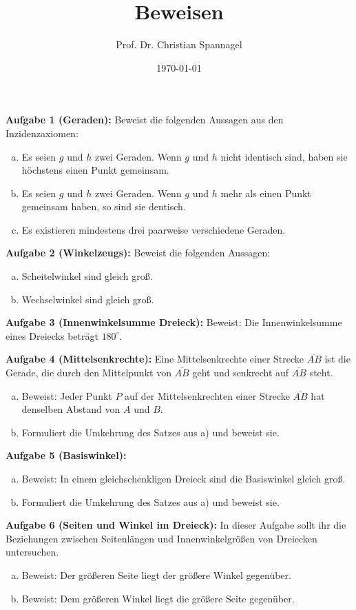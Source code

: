 \documentclass{../cssheet}
\title{Beweisen}
\author{Prof. Dr. Christian Spannagel}
\date{\today}
\begin{document}
\printtitle

\textbf{Aufgabe 1 (Geraden):}  Beweist die folgenden Aussagen aus den Inzidenzaxiomen:
\begin{enumerate}[a)]
\item Es seien $g$ und $h$ zwei Geraden. Wenn $g$ und $h$ nicht identisch sind, haben sie höchstens einen Punkt gemeinsam.
\item Es seien $g$ und $h$ zwei Geraden. Wenn $g$ und $h$ mehr als einen Punkt gemeinsam haben, so sind sie dentisch.
\item Es existieren mindestens drei paarweise verschiedene Geraden.
\end{enumerate}

\textbf{Aufgabe 2 (Winkelzeugs):}  Beweist die folgenden Aussagen:
\begin{enumerate}[a)]
\item Scheitelwinkel sind gleich groß.
\item Wechselwinkel sind gleich groß.
\end{enumerate}


\textbf{Aufgabe 3 (Innenwinkelsumme Dreieck):}  Beweist: Die Innenwinkelsumme eines Dreiecks beträgt $180^\circ$.

\textbf{Aufgabe 4 (Mittelsenkrechte):} Eine Mittelsenkrechte einer Strecke $\overline{AB}$ ist die Gerade, die durch den Mittelpunkt von $\overline{AB}$ geht und senkrecht auf $\overline{AB}$ steht.
\begin{enumerate}[a)]
\item Beweist: Jeder Punkt $P$ auf der Mittelsenkrechten einer Strecke $\overline{AB}$ hat denselben Abstand von $A$ und $B$.
\item Formuliert die Umkehrung des Satzes aus a) und beweist sie.
\end{enumerate}

\textbf{Aufgabe 5 (Basiswinkel):} 
\begin{enumerate}[a)]
\item Beweist: In einem gleichschenkligen Dreieck sind die Basiswinkel gleich groß.
\item Formuliert die Umkehrung des Satzes aus a) und beweist sie.
\end{enumerate}

\textbf{Aufgabe 6 (Seiten und Winkel im Dreieck):} 
In dieser Aufgabe sollt ihr die Beziehungen zwischen Seitenlängen und Innenwinkelgrößen von Dreiecken untersuchen.
\begin{enumerate}[a)]
\item Beweist: Der größeren Seite liegt der größere Winkel gegenüber.
\item Beweist: Dem größeren Winkel liegt die größere Seite gegenüber.
\end{enumerate}
\end{document}
